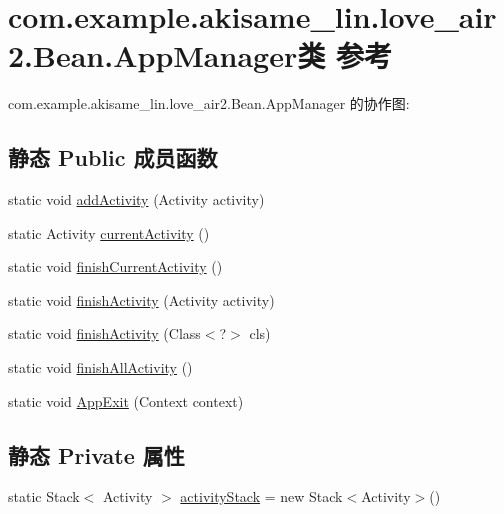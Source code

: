 \hypertarget{classcom_1_1example_1_1akisame__lin_1_1love__air2_1_1_bean_1_1_app_manager}{}\section{com.\+example.\+akisame\+\_\+lin.\+love\+\_\+air2.\+Bean.\+App\+Manager类 参考}
\label{classcom_1_1example_1_1akisame__lin_1_1love__air2_1_1_bean_1_1_app_manager}


com.\+example.\+akisame\+\_\+lin.\+love\+\_\+air2.\+Bean.\+App\+Manager 的协作图\+:
\subsection*{静态 Public 成员函数}
\begin{DoxyCompactItemize}
\item 
static void \mbox{\hyperlink{classcom_1_1example_1_1akisame__lin_1_1love__air2_1_1_bean_1_1_app_manager_a221d4e0be0039be3f672aa7f41dc846c}{add\+Activity}} (Activity activity)
\item 
static Activity \mbox{\hyperlink{classcom_1_1example_1_1akisame__lin_1_1love__air2_1_1_bean_1_1_app_manager_a389ff3d67637e73e722aa6274a167c0c}{current\+Activity}} ()
\item 
static void \mbox{\hyperlink{classcom_1_1example_1_1akisame__lin_1_1love__air2_1_1_bean_1_1_app_manager_ab78bcc8619fb444e866aea65fee46386}{finish\+Current\+Activity}} ()
\item 
static void \mbox{\hyperlink{classcom_1_1example_1_1akisame__lin_1_1love__air2_1_1_bean_1_1_app_manager_a6e67d6a286bf729c546b6a95ba016cc1}{finish\+Activity}} (Activity activity)
\item 
static void \mbox{\hyperlink{classcom_1_1example_1_1akisame__lin_1_1love__air2_1_1_bean_1_1_app_manager_abd6bf84a505b73f0ed3e47c6480a5ba7}{finish\+Activity}} (Class$<$?$>$ cls)
\item 
static void \mbox{\hyperlink{classcom_1_1example_1_1akisame__lin_1_1love__air2_1_1_bean_1_1_app_manager_aed88d04478ec8f70362f104353a88abe}{finish\+All\+Activity}} ()
\item 
static void \mbox{\hyperlink{classcom_1_1example_1_1akisame__lin_1_1love__air2_1_1_bean_1_1_app_manager_ace768949698c5fd46e3fd8bd7c7b0b5c}{App\+Exit}} (Context context)
\end{DoxyCompactItemize}
\subsection*{静态 Private 属性}
\begin{DoxyCompactItemize}
\item 
static Stack$<$ Activity $>$ \mbox{\hyperlink{classcom_1_1example_1_1akisame__lin_1_1love__air2_1_1_bean_1_1_app_manager_ac7d22694c968506e587e2a9f28b565e7}{activity\+Stack}} = new Stack$<$Activity$>$()
\end{DoxyCompactItemize}



